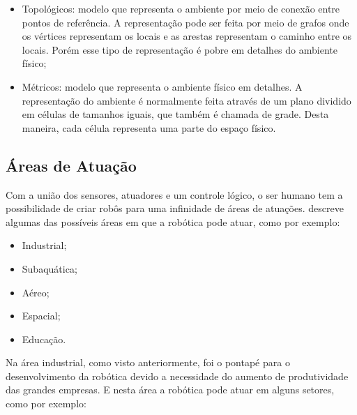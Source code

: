 \begin{itemize}
	\item Topológicos: modelo que representa o ambiente por meio de conexão entre pontos de referência. A representação pode ser feita por meio de grafos onde os vértices representam os locais e as arestas representam o caminho entre os locais. Porém esse tipo de representação é pobre em detalhes do ambiente físico;
	
	\item Métricos: modelo que representa o ambiente físico em detalhes. A representação do ambiente é normalmente feita através de um plano dividido em células de tamanhos iguais, que também é chamada de grade. Desta maneira, cada célula representa uma parte do espaço físico.
\end{itemize}

\subsection{Áreas de Atuação}\label{sec:atuation}
Com a união dos sensores, atuadores e um controle lógico, o ser humano tem a possibilidade de criar robôs para uma infinidade de áreas de atuações. \cite{siciliano2016} descreve algumas das possíveis áreas em que a robótica pode atuar, como por exemplo:

\begin{itemize}
	\item Industrial;
	
	\item Subaquática;
	
	\item Aéreo;
	
	\item Espacial;
	
	\item Educação.
\end{itemize}

Na área industrial, como visto anteriormente, foi o pontapé para o desenvolvimento da robótica devido a necessidade do aumento de produtividade das grandes empresas. E nesta área a robótica pode atuar em alguns setores, como por exemplo:

